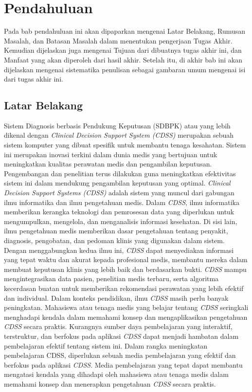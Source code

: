 \chapter{Pendahuluan}
Pada bab pendahuluan ini akan dipaparkan mengenai Latar Belakang, Rumusan Masalah, dan Batasan Masalah dalam menentukan pengerjaan Tugas Akhir.
Kemudian dijelaskan juga mengenai Tujuan dari dibuatnya tugas akhir ini, dan Manfaat yang akan diperoleh dari hasil akhir.
Setelah itu, di akhir bab ini akan dijelaskan mengenai sistematika penulisan sebagai gambaran umum mengenai isi dari tugas akhir ini.

\section{Latar Belakang}
Sistem Diagnosis berbasis Pendukung Keputusan (SDBPK) atau yang lebih dikenal dengan \textit{Clinical Decision Support System (CDSS)}
merupakan sebuah sistem komputer yang dibuat spesifik untuk membantu tenaga kesahatan.
Sistem ini merupakan inovasi terkini dalam dunia medis yang bertujuan untuk meningkatkan kualitas perawatan medis dan pengambilan keputusan.
Pengembangan dan penelitian terus dilakukan guna meningkatkan efektivitas sistem ini dalam mendukung pengambilan keputusan yang optimal.
\textit{Clinical Decision Support Systems (CDSS)} adalah sistem yang muncul dari gabungan ilmu informatika dan ilmu pengetahuan medis.
Dalam \textit{CDSS}, ilmu informatika memberikan kerangka teknologi dan pemrosesan data yang diperlukan untuk mengumpulkan, mengelola, dan menganalisis informasi kesehatan.
Di sisi lain, ilmu pengetahuan medis memberikan dasar pengetahuan tentang penyakit, diagnosis, pengobatan, dan pedoman klinis yang digunakan dalam sistem. 
Dengan menggabungkan kedua ilmu ini, \textit{CDSS} dapat menyediakan informasi yang tepat waktu dan akurat kepada profesional medis, membantu mereka dalam membuat keputusan klinis yang lebih baik dan berdasarkan bukti.
\textit{CDSS} mampu mengintegrasikan data pasien, penelitian medis terbaru, serta algoritma kecerdasan buatan untuk memberikan rekomendasi perawatan yang lebih efektif dan individual.
Dalam konteks pendidikan, ilmu \textit{CDSS} masih perlu banyak peningkatan.
Mahasiswa atau tenaga medis yang belajar tentang \textit{CDSS} seringkali menghadapi kendala dalam memahami konsep dan mengaplikasikan pengetahuan \textit{CDSS} secara praktis.
Kurangnya sumber daya pembelajaran yang interaktif, terstruktur, dan berfokus pada aplikasi \textit{CDSS} dapat menjadi hambatan dalam pembelajaran efektif tentang sistem ini.
Dalam rangka meningkatan pembelajaran CDSS, diperlukan sebuah media pembelajaran yang efektif dan berfokus pada aplikasi \textit{CDSS}.
Media pembelajaran yang tepat dapat membantu mengatasi kendala yang dihadapi oleh mahasiswa atau tenaga medis dalam memahami konsep dan menerapkan pengetahuan \textit{CDSS} secara praktis.

